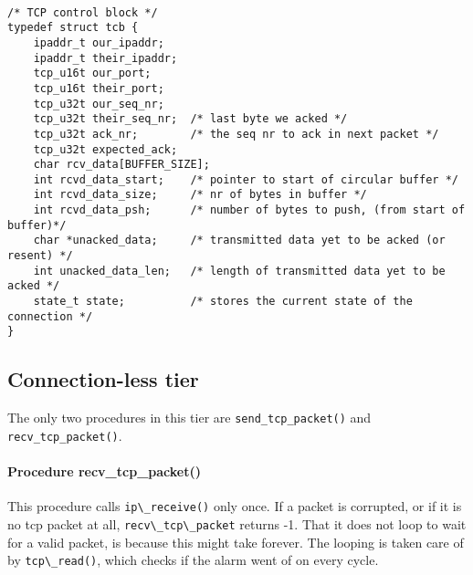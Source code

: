 \documentclass[11pt]{article}
\begin{document}
\paragraph{}


\begin{lstlisting}[title=The TCP Control Block structure]
/* TCP control block */
typedef struct tcb {
    ipaddr_t our_ipaddr;
    ipaddr_t their_ipaddr;
    tcp_u16t our_port;
    tcp_u16t their_port;
    tcp_u32t our_seq_nr;
    tcp_u32t their_seq_nr;  /* last byte we acked */
    tcp_u32t ack_nr;        /* the seq nr to ack in next packet */
    tcp_u32t expected_ack;  
    char rcv_data[BUFFER_SIZE];
    int rcvd_data_start;    /* pointer to start of circular buffer */
    int rcvd_data_size;     /* nr of bytes in buffer */
    int rcvd_data_psh;      /* number of bytes to push, (from start of buffer)*/
    char *unacked_data;     /* transmitted data yet to be acked (or resent) */
    int unacked_data_len;   /* length of transmitted data yet to be acked */
    state_t state;          /* stores the current state of the connection */
}

\end{lstlisting}


\paragraph{}


\subsection{Connection-less tier}

The only two procedures in this tier are \verb|send_tcp_packet()| and
\verb|recv_tcp_packet()|.

\paragraph{Procedure recv\_tcp\_packet()}
This procedure calls \verb|ip\_receive()| only once. If a packet is corrupted,
or if it is no tcp packet at all, \verb|recv\_tcp\_packet| returns -1.
That it does not loop to wait for a valid packet, is because this might take 
forever. The looping is taken care of by \verb|tcp\_read()|, which checks if the alarm 
went of on every cycle.
\end{document}
